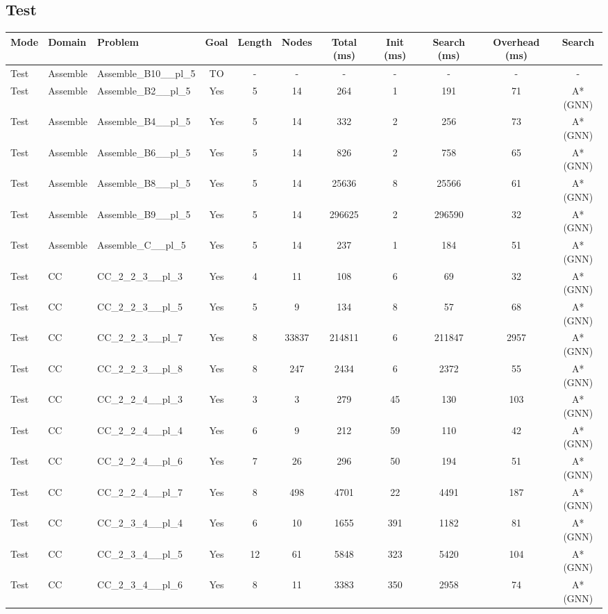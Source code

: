 \documentclass{article}
\begin{document}
\subsection*{Test}
\begin{tabular}{lllcccccccc}
\toprule
Mode & Domain & Problem & Goal & Length & Nodes & Total (ms) & Init (ms) & Search (ms) & Overhead (ms) & Search \\
\midrule
Test & Assemble & Assemble\_B10\_\_pl\_5 & TO & - & - & - & - & - & - & - \\
Test & Assemble & Assemble\_B2\_\_pl\_5 & Yes & 5 & 14 & 264 & 1 & 191 & 71 & A*(GNN) \\
Test & Assemble & Assemble\_B4\_\_pl\_5 & Yes & 5 & 14 & 332 & 2 & 256 & 73 & A*(GNN) \\
Test & Assemble & Assemble\_B6\_\_pl\_5 & Yes & 5 & 14 & 826 & 2 & 758 & 65 & A*(GNN) \\
Test & Assemble & Assemble\_B8\_\_pl\_5 & Yes & 5 & 14 & 25636 & 8 & 25566 & 61 & A*(GNN) \\
Test & Assemble & Assemble\_B9\_\_pl\_5 & Yes & 5 & 14 & 296625 & 2 & 296590 & 32 & A*(GNN) \\
Test & Assemble & Assemble\_C\_\_pl\_5 & Yes & 5 & 14 & 237 & 1 & 184 & 51 & A*(GNN) \\
Test & CC & CC\_2\_2\_3\_\_pl\_3 & Yes & 4 & 11 & 108 & 6 & 69 & 32 & A*(GNN) \\
Test & CC & CC\_2\_2\_3\_\_pl\_5 & Yes & 5 & 9 & 134 & 8 & 57 & 68 & A*(GNN) \\
Test & CC & CC\_2\_2\_3\_\_pl\_7 & Yes & 8 & 33837 & 214811 & 6 & 211847 & 2957 & A*(GNN) \\
Test & CC & CC\_2\_2\_3\_\_pl\_8 & Yes & 8 & 247 & 2434 & 6 & 2372 & 55 & A*(GNN) \\
Test & CC & CC\_2\_2\_4\_\_pl\_3 & Yes & 3 & 3 & 279 & 45 & 130 & 103 & A*(GNN) \\
Test & CC & CC\_2\_2\_4\_\_pl\_4 & Yes & 6 & 9 & 212 & 59 & 110 & 42 & A*(GNN) \\
Test & CC & CC\_2\_2\_4\_\_pl\_6 & Yes & 7 & 26 & 296 & 50 & 194 & 51 & A*(GNN) \\
Test & CC & CC\_2\_2\_4\_\_pl\_7 & Yes & 8 & 498 & 4701 & 22 & 4491 & 187 & A*(GNN) \\
Test & CC & CC\_2\_3\_4\_\_pl\_4 & Yes & 6 & 10 & 1655 & 391 & 1182 & 81 & A*(GNN) \\
Test & CC & CC\_2\_3\_4\_\_pl\_5 & Yes & 12 & 61 & 5848 & 323 & 5420 & 104 & A*(GNN) \\
Test & CC & CC\_2\_3\_4\_\_pl\_6 & Yes & 8 & 11 & 3383 & 350 & 2958 & 74 & A*(GNN) \\

\end{tabular}
\end{document}
